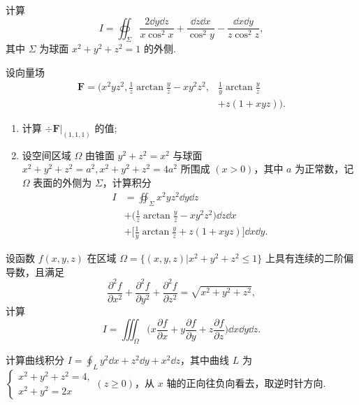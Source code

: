 	\begin{ti}
		计算
		\[
			I = \oiint_{\varSigma} \frac{2 \dd{y} \dd{z}}{x \cos^{2}x} + \frac{\dd{z} \dd{x}}{\cos^{2}y} - \frac{\dd{x} \dd{y}}{z \cos^{2}z},
		\]
		其中 $\varSigma$ 为球面 $x^{2} + y^{2} + z^{2} = 1$ 的外侧.
	\end{ti}

	\begin{ti}
		设向量场
		\begin{align*}
			\bm F = \Biggl( x^{2} y z^{2}, \frac{1}{z} \arctan \frac{y}{z} - x y^{2} z^{2}, &\frac{1}{y} \arctan \frac{y}{z}\\
			&+ z(1 + xyz) \Biggr).
		\end{align*}
		\begin{enumerate}
			\item 计算 $\div \bm F |_{(1,1,1)}$ 的值;
			\item 设空间区域 $\varOmega$ 由锥面 $y^{2} + z^{2} = x^{2}$ 与球面 $x^{2} + y^{2} + z^{2} = a^{2}, x^{2} + y^{2} + z^{2} = 4 a^{2}$ 所围成 $(x > 0)$，其中 $a$ 为正常数，记 $\varOmega$ 表面的外侧为 $\varSigma$，计算积分
			\begin{align*}
				I
				&= \oiint_{\varSigma} x^{2} y z^{2} \dd{y} \dd{z}\\
				&+ \Biggl( \frac{1}{z} \arctan \frac{y}{z} - x y^{2} z^{2} \Biggr) \dd{z} \dd{x}\\
				&+ \Biggl[ \frac{1}{y} \arctan \frac{y}{z} + z(1 + xyz) \Biggr] \dd{x} \dd{y}.
			\end{align*}
		\end{enumerate}
	\end{ti}

	\begin{ti}
		设函数 $f(x,y,z)$ 在区域 $\varOmega = \bigl\{ (x,y,z) \bigl| x^{2} + y^{2} + z^{2} \leq 1 \bigr\}$ 上具有连续的二阶偏导数，且满足
		\[
			\frac{\partial^{2}f}{\partial x^{2}} + \frac{\partial^{2}f}{\partial y^{2}} + \frac{\partial^{2}f}{\partial z^{2}} = \sqrt{x^{2} + y^{2} + z^{2}},
		\]
		计算
		\[
			I = \iiint_{\varOmega} \Biggl( x \frac{\partial f}{\partial x} + y \frac{\partial f}{\partial y} + z \frac{\partial f}{\partial z} \Biggr) \dd{x} \dd{y} \dd{z}.
		\]
	\end{ti}

	\begin{ti}
		计算曲线积分 $I = \oint_{L} y^{2} \dd{x} + z^{2} \dd{y} + x^{2} \dd{z}$，其中曲线 $L$ 为 $\begin{cases}
			x^{2} + y^{2} + z^{2} = 4,\\
			x^{2} + y^{2} = 2x
		\end{cases} (z \geq 0)$，从 $x$ 轴的正向往负向看去，取逆时针方向.
	\end{ti}